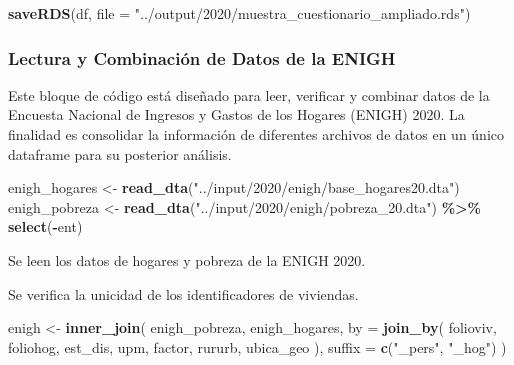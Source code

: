 \documentclass[
  12pt,
]{book}
\newenvironment{Shaded}{\begin{snugshade}}{\end{snugshade}}
\newcommand{\AttributeTok}[1]{\textcolor[rgb]{0.13,0.29,0.53}{#1}}
\newcommand{\FunctionTok}[1]{\textcolor[rgb]{0.13,0.29,0.53}{\textbf{#1}}}
\newcommand{\NormalTok}[1]{#1}
\newcommand{\OtherTok}[1]{\textcolor[rgb]{0.56,0.35,0.01}{#1}}
\newcommand{\SpecialCharTok}[1]{\textcolor[rgb]{0.81,0.36,0.00}{\textbf{#1}}}
\newcommand{\StringTok}[1]{\textcolor[rgb]{0.31,0.60,0.02}{#1}}
\begin{document}
\begin{Shaded}
\begin{Highlighting}[]
\FunctionTok{saveRDS}\NormalTok{(df, }\AttributeTok{file =} \StringTok{"../output/2020/muestra\_cuestionario\_ampliado.rds"}\NormalTok{)}
\end{Highlighting}
\end{Shaded}

\hypertarget{lectura-y-combinaciuxf3n-de-datos-de-la-enigh}{%
\subsubsection*{Lectura y Combinación de Datos de la ENIGH}\label{lectura-y-combinaciuxf3n-de-datos-de-la-enigh}}

Este bloque de código está diseñado para leer, verificar y combinar datos de la Encuesta Nacional de Ingresos y Gastos de los Hogares (ENIGH) 2020. La finalidad es consolidar la información de diferentes archivos de datos en un único dataframe para su posterior análisis.

\begin{Shaded}
\begin{Highlighting}[]
\NormalTok{enigh\_hogares }\OtherTok{\textless{}{-}} \FunctionTok{read\_dta}\NormalTok{(}\StringTok{"../input/2020/enigh/base\_hogares20.dta"}\NormalTok{)}
\NormalTok{enigh\_pobreza }\OtherTok{\textless{}{-}} \FunctionTok{read\_dta}\NormalTok{(}\StringTok{"../input/2020/enigh/pobreza\_20.dta"}\NormalTok{) }\SpecialCharTok{\%\textgreater{}\%} 
  \FunctionTok{select}\NormalTok{(}\SpecialCharTok{{-}}\NormalTok{ent)}
\end{Highlighting}
\end{Shaded}

Se leen los datos de hogares y pobreza de la ENIGH 2020.

\begin{Shaded}
\end{Shaded}

Se verifica la unicidad de los identificadores de viviendas.

\begin{Shaded}
\begin{Highlighting}[]
\NormalTok{enigh }\OtherTok{\textless{}{-}} \FunctionTok{inner\_join}\NormalTok{(}
\NormalTok{  enigh\_pobreza,}
\NormalTok{  enigh\_hogares,}
  \AttributeTok{by =} \FunctionTok{join\_by}\NormalTok{(}
\NormalTok{    folioviv, foliohog, est\_dis, upm,}
\NormalTok{    factor, rururb, ubica\_geo}
\NormalTok{  ), }
  \AttributeTok{suffix =} \FunctionTok{c}\NormalTok{(}\StringTok{"\_pers"}\NormalTok{, }\StringTok{"\_hog"}\NormalTok{)}
\NormalTok{)}
\end{Highlighting}
\end{Shaded}
\end{document}
